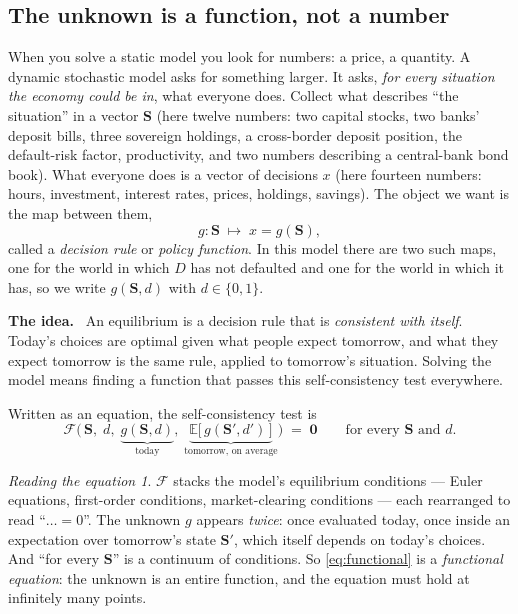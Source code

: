 \documentclass[10pt,a4paper]{article}
\newenvironment{idea}{\begin{shaded}\noindent\textbf{The idea.}\ }{\end{shaded}}
\theoremstyle{plain}
\theoremstyle{remark}
\newtheorem*{reading}{Reading the equation}
\newcommand{\E}{\mathbb{E}}
\newcommand{\st}{\mathbf{S}}
\begin{document}
\subsection{The unknown is a function, not a number}

When you solve a static model you look for numbers: a price, a quantity. A dynamic
stochastic model asks for something larger. It asks, \emph{for every situation the economy
could be in}, what everyone does. Collect what describes ``the situation'' in a vector
$\st$ (here twelve numbers: two capital stocks, two banks' deposit bills, three
sovereign holdings, a cross-border deposit position, the default-risk factor, productivity,
and two numbers describing a central-bank bond book). What everyone does is a vector of
decisions $x$ (here fourteen numbers: hours, investment, interest rates, prices, holdings,
savings). The object we want is the map between them,
\begin{equation}
  g : \st \;\longmapsto\; x = g(\st),
\end{equation}
called a \emph{decision rule} or \emph{policy function}. In this model there are two such
maps, one for the world in which $D$ has not defaulted and one for the world in which it
has, so we write $g(\st, d)$ with $d\in\{0,1\}$.

\begin{idea}
An equilibrium is a decision rule that is \emph{consistent with itself}. Today's choices
are optimal given what people expect tomorrow, and what they expect tomorrow is the same
rule, applied to tomorrow's situation. Solving the model means finding a function that
passes this self-consistency test everywhere.
\end{idea}

\noindent Written as an equation, the self-consistency test is
\begin{equation}
  \mathcal{F}\Big(\,\st,\; d,\; \underbrace{g(\st,d)}_{\text{today}},\;
     \underbrace{\E\big[\,g(\st',d')\,\big]}_{\text{tomorrow, on average}}\Big) \;=\; \bm 0
  \qquad\text{for every } \st \text{ and } d .
  \label{eq:functional}
\end{equation}

\begin{reading}
$\mathcal{F}$ stacks the model's equilibrium conditions --- Euler equations, first-order
conditions, market-clearing conditions --- each rearranged to read ``$\ldots = 0$''. The
unknown $g$ appears \emph{twice}: once evaluated today, once inside an expectation over
tomorrow's state $\st'$, which itself depends on today's choices. And ``for every $\st$'' is
a continuum of conditions. So \eqref{eq:functional} is a \emph{functional equation}: the
unknown is an entire function, and the equation must hold at infinitely many points.
\end{reading}
\end{document}
